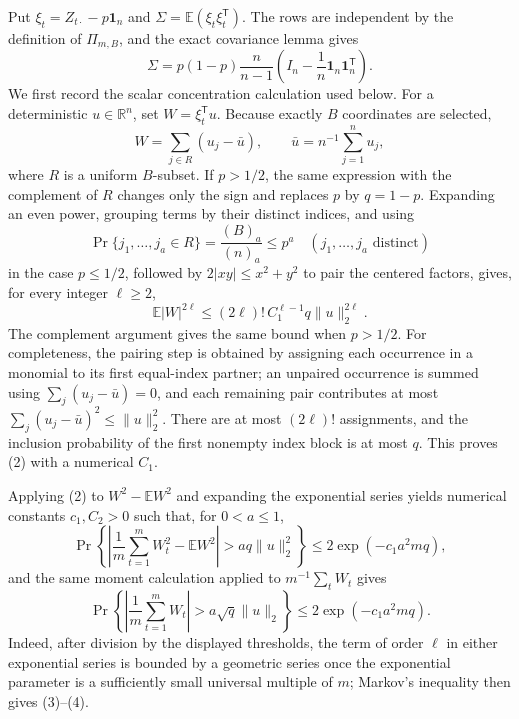 Put \(\xi_t=Z_{t\cdot}-p\mathbf 1_n\) and \(\Sigma=\mathbb E(\xi_t\xi_t^{\mathsf T})\).  The rows are independent by the definition of \(\Pi_{m,B}\), and the exact covariance lemma gives
\[
 \Sigma=p(1-p)\frac{n}{n-1}
 \left(I_n-\frac1n\mathbf 1_n\mathbf 1_n^{\mathsf T}\right).                                      \tag{1}
\]
We first record the scalar concentration calculation used below.  For a deterministic \(u\in\mathbb R^n\), set \(W=\xi_t^{\mathsf T}u\).  Because exactly \(B\) coordinates are selected,
\[
 W=\sum_{j\in R}(u_j-\bar u),
 \qquad
 \bar u=n^{-1}\sum_{j=1}^n u_j,
\]
where \(R\) is a uniform \(B\)-subset.  If \(p>1/2\), the same expression with the complement of \(R\) changes only the sign and replaces \(p\) by \(q=1-p\).  Expanding an even power, grouping terms by their distinct indices, and using
\[
 \Pr\{j_1,\ldots,j_a\in R\}=\frac{(B)_a}{(n)_a}\le p^a
 \quad (j_1,\ldots,j_a\text{ distinct})
\]
in the case \(p\le1/2\), followed by \(2|xy|\le x^2+y^2\) to pair the centered factors, gives, for every integer \(\ell\ge2\),
\[
 \mathbb E|W|^{2\ell}
 \le (2\ell)!\,C_1^{\ell-1}q\lVert u\rVert_2^{2\ell}.                                      \tag{2}
\]
The complement argument gives the same bound when \(p>1/2\).  For completeness, the pairing step is obtained by assigning each occurrence in a monomial to its first equal-index partner; an unpaired occurrence is summed using \(\sum_j(u_j-\bar u)=0\), and each remaining pair contributes at most \(\sum_j(u_j-\bar u)^2\le\lVert u\rVert_2^2\).  There are at most \((2\ell)!\) assignments, and the inclusion probability of the first nonempty index block is at most \(q\).  This proves (2) with a numerical \(C_1\).

Applying (2) to \(W^2-\mathbb EW^2\) and expanding the exponential series yields numerical constants \(c_1,C_2>0\) such that, for \(0<a\le1\),
\[
 \Pr\left\{\left|\frac1m\sum_{t=1}^mW_t^2-\mathbb EW^2\right|>a q\lVert u\rVert_2^2\right\}
 \le2\exp(-c_1a^2mq),                                                \tag{3}
\]
and the same moment calculation applied to \(m^{-1}\sum_tW_t\) gives
\[
 \Pr\left\{\left|\frac1m\sum_{t=1}^mW_t\right|>a\sqrt q\lVert u\rVert_2\right\}
 \le2\exp(-c_1a^2mq).                                                \tag{4}
\]
Indeed, after division by the displayed thresholds, the term of order \(\ell\) in either exponential series is bounded by a geometric series once the exponential parameter is a sufficiently small universal multiple of \(m\); Markov's inequality then gives (3)--(4).


